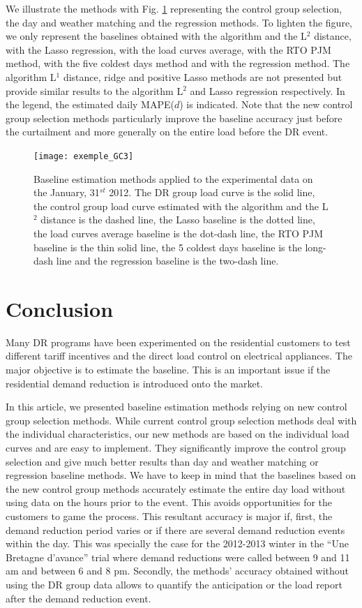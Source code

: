 \documentclass[journal]{IEEEtran}
\begin{document}
We illustrate the methods with Fig. \ref{exemple_GC3} representing the 
control group selection, the day and weather matching and the regression methods. 
To lighten the figure, we only represent the baselines obtained with the algorithm and 
the L$^2$ distance, with the Lasso regression, with the load curves average, with the 
RTO PJM method, with the five coldest days method and with the regression method. The algorithm L$^1$ 
distance, ridge and positive Lasso methods are not presented but provide similar results 
to the algorithm L$^2$ and Lasso regression respectively. 
In the legend, the estimated daily MAPE($d$) is indicated. Note that the 
new control group selection methods particularly improve 
the baseline accuracy just before the curtailment and more generally on the entire load 
before the DR event.
\begin{figure}[!h]
\centering
\texttt{[image: exemple\_GC3]}
\caption{{\scriptsize Baseline estimation methods applied to the experimental data on the January, 31$^{st}$ 2012.
The DR group load curve is the solid line, the control group load curve estimated with 
the algorithm and the L$^2$ distance is the dashed line, the Lasso baseline is the 
dotted line, the load curves average baseline 
is the dot-dash line, the RTO PJM baseline is the thin solid line, the 5 coldest days baseline is 
the long-dash line and the regression baseline is the two-dash line.}}
\label{exemple_GC3}
\end{figure}

\section{Conclusion}\label{sec:conclu}

Many DR programs have been experimented on the residential customers to 
test different tariff incentives and the direct load control on electrical 
appliances. The major objective is to estimate the baseline. This is an 
important issue if the residential demand reduction is introduced onto the 
market.

In this article, we presented baseline estimation methods relying on new control group 
selection methods. While current control group selection methods deal with 
the individual characteristics, our new methods are based on the individual load curves 
and are easy to implement. They significantly improve the control group selection and 
give much better results than day and weather matching or regression baseline methods. We 
have to keep in mind that the baselines based on the new control group methods accurately estimate 
the entire day load without using data on the hours prior to the event. This 
avoids opportunities for the customers to game the process. This resultant accuracy 
is major if, first, the demand reduction period varies or if there are several 
demand reduction events within the day. This was specially the case for the 
2012-2013 winter in the ``Une Bretagne d'avance'' trial where demand reductions were called between 
9 and 11 am and between 6 and 8 pm. Secondly, the methods' accuracy obtained without 
using the DR group data allows to quantify the anticipation or the load report after 
the demand reduction event.
\end{document}
